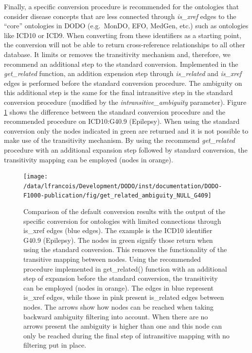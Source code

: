\documentclass[9pt,a4paper,]{extarticle}
\begin{document}
Finally, a specific conversion procedure is recommended for the ontologies that consider disease concepts that are less connected through \emph{is\_xref} edges to the ``core'' ontologies in DODO (e.g.~MonDO, EFO, MedGen, etc.) such as ontologies like ICD10 or ICD9. When converting from these identifiers as a starting point, the conversion will not be able to return cross-reference relationships to all other database. It limits or removes the transitivity mechanism and, therefore, we recommend an additional step to the standard conversion. Implemented in the \emph{get\_related} function, an addition expension step through \emph{is\_related} and \emph{is\_xref} edges is performed before the standard conversion procedure. The ambiguity on this additional step is the same for the final intransitive step in the standard conversion procedure (modified by the \emph{intransitive\_ambiguity} parameter). Figure \ref{fig:getRelated} shows the difference between the standard conversion procedure and the recommended procedure on ICD10:G40.9 (Epilepsy). When using the standard conversion only the nodes indicated in green are returned and it is not possible to make use of the transitivity mechanism. By using the recommend \emph{get\_related} procedure with an additional expansion step followed by standard conversion, the transitivity mapping can be employed (nodes in orange).

\begin{figure}

{\centering \texttt{[image: /data/lfrancois/Development/DODO/inst/documentation/DODO-F1000-publication/fig/get\_related\_ambiguity\_NULL\_G409]} 

}

\caption{Comparison of the default conversion results with the output of the specific conversion for ontologies with limited connections through is\_xref edges (blue edges). The example is the ICD10 identifier G40.9 (Epilepsy). The nodes in green signify those return when using the standard conversion. This removes the functionality of the transitive mapping between nodes. Using the recommended procedure implemented in get\_related() function with an additional step of expansion before the standard conversion, the transitivity can be employed (nodes in orange). The edges in blue represent is\_xref edges, while those in pink present is\_related edges between nodes. The arrows show how nodes can be reached when taking backward ambiguity filtering into account. When there are no arrows present the ambiguity is higher than one and this node can only be reached during the final step of intransitive mapping with no filtering put in place.}\label{fig:getRelated}
\end{figure}
\end{document}
